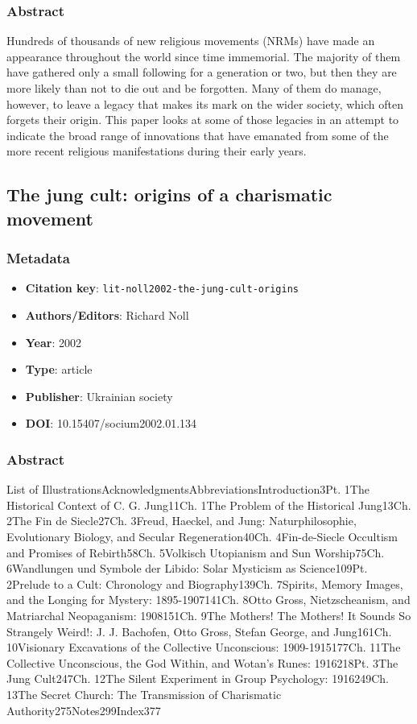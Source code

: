 \subsubsection*{Abstract}
Hundreds of thousands of new religious movements (NRMs) have made an appearance throughout the world since time immemorial. The majority of them have gathered only a small following for a generation or two, but then they are more likely than not to die out and be forgotten. Many of them do manage, however, to leave a legacy that makes its mark on the wider society, which often forgets their origin. This paper looks at some of those legacies in an attempt to indicate the broad range of innovations that have emanated from some of the more recent religious manifestations during their early years.

\subsection{The jung cult: origins of a charismatic movement}\label{lit:lit-noll2002-the-jung-cult-origins}
\subsubsection*{Metadata}
\begin{itemize}
  \item \textbf{Citation key}: \texttt{lit-noll2002-the-jung-cult-origins}
  \item \textbf{Authors/Editors}: Richard Noll
  \item \textbf{Year}: 2002
  \item \textbf{Type}: article
  \item \textbf{Publisher}: Ukrainian society
  \item \textbf{DOI}: 10.15407/socium2002.01.134
\end{itemize}
\subsubsection*{Abstract}
List of IllustrationsAcknowledgmentsAbbreviationsIntroduction3Pt. 1The Historical Context of C. G. Jung11Ch. 1The Problem of the Historical Jung13Ch. 2The Fin de Siecle27Ch. 3Freud, Haeckel, and Jung: Naturphilosophie, Evolutionary Biology, and Secular Regeneration40Ch. 4Fin-de-Siecle Occultism and Promises of Rebirth58Ch. 5Volkisch Utopianism and Sun Worship75Ch. 6Wandlungen und Symbole der Libido: Solar Mysticism as Science109Pt. 2Prelude to a Cult: Chronology and Biography139Ch. 7Spirits, Memory Images, and the Longing for Mystery: 1895-1907141Ch. 8Otto Gross, Nietzscheanism, and Matriarchal Neopaganism: 1908151Ch. 9The Mothers! The Mothers! It Sounds So Strangely Weird!: J. J. Bachofen, Otto Gross, Stefan George, and Jung161Ch. 10Visionary Excavations of the Collective Unconscious: 1909-1915177Ch. 11The Collective Unconscious, the God Within, and Wotan's Runes: 1916218Pt. 3The Jung Cult247Ch. 12The Silent Experiment in Group Psychology: 1916249Ch. 13The Secret Church: The Transmission of Charismatic Authority275Notes299Index377

